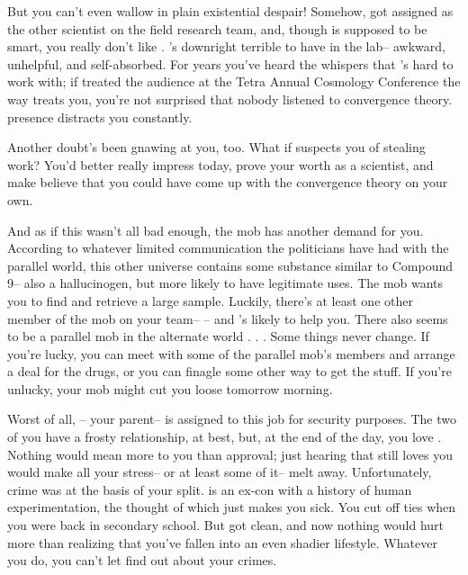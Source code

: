 \documentclass[char]{guildcamp3}
\begin{document}
But you can't even wallow in plain existential despair! Somehow, \cSciTwo{} got assigned as the other scientist on the field research team, and, though \cSciTwo{\they} is supposed to be smart, you really don't like \cSciTwo{\them}. \cSciTwo{\they}'s downright terrible to have in the lab-- awkward, unhelpful, and self-absorbed. For years you've heard the whispers that \cSciTwo{\they}'s hard to work with; if \cSciTwo{\they} treated the audience at the Tetra Annual Cosmology Conference the way \cSciTwo{\they} treats you, you're not surprised that nobody listened to \cSciTwo{\their} convergence theory. \cSciTwo{\Their} presence distracts you constantly.

Another doubt's been gnawing at you, too. What if \cSciTwo{\they} suspects you of stealing \cSciTwo{\their} work? You'd better really impress \cSciTwo{\them} today, prove your worth as a scientist, and make \cSciTwo{\them} believe that you could have come up with the convergence theory on your own.

And as if this wasn't all bad enough, the mob has another demand for you. According to whatever limited communication the politicians have had with the parallel world, this other universe contains some substance similar to Compound 9-- also a hallucinogen, but more likely to have legitimate uses. The mob wants you to find and retrieve a large sample. Luckily, there's at least one other member of the mob on your team-- \cSpecOpTwo{\intro}-- and \cSpecOpTwo{\they}'s likely to help you. There also seems to be a parallel mob in the alternate world . . . Some things never change. If you're lucky, you can meet with some of the parallel mob's members and arrange a deal for the drugs, or you can finagle some other way to get the stuff. If you're unlucky, your mob might cut you loose tomorrow morning.

Worst of all, \cSpecOpOne{\intro}-- your parent-- is assigned to this job for security purposes. The two of you have a frosty relationship, at best, but, at the end of the day, you love \cSpecOpOne{\them}. Nothing would mean more to you than \cSpecOpOne{\their} approval; just hearing that \cSpecOpOne{\they} still loves you would make all your stress-- or at least some of it-- melt away. Unfortunately, crime was at the basis of your split. \cSpecOpOne{} is an ex-con with a history of human experimentation, the thought of which just makes you sick. You cut off ties when you were back in secondary school. But\cSpecOpOne{\they} got clean, and now nothing would hurt \cSpecOpOne{\them} more than realizing that you've fallen into an even shadier lifestyle. Whatever you do, you can't let \cSpecOpOne{\them} find out about your crimes.
\end{document}
